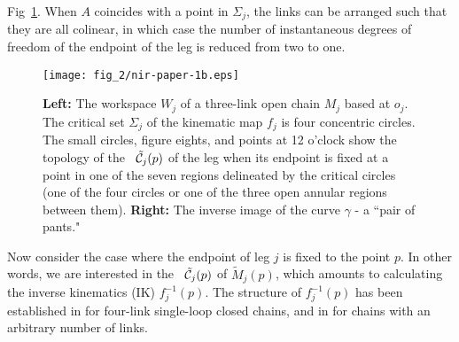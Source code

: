 Fig~\ref{fig:single-leg}. When $A$ coincides with a point in
$\Sigma_j$, the links can be arranged such that they are all
colinear, in which case the number of instantaneous degrees of
freedom of the endpoint of the leg is reduced from two to one.
%
\begin{figure}
  \centering
  \texttt{[image: fig\_2/nir-paper-1b.eps]}
  \caption{{\bf Left:} The workspace $W_j$ of a three-link open chain $M_j$
    based at $o_j$. The critical set $\Sigma_j$ of the kinematic map $f_j$ is four
    concentric circles.  The small circles, figure eights, and points at 12 o'clock
    show the topology of the \cspace \ $\tilde {\cal C}_j(p)$ of the
    leg when its endpoint is fixed at a point in one of the seven regions
    delineated by the critical circles (one of the four circles or one of
    the three open annular regions between them).  {\bf Right:} The inverse
    image of the curve $\gamma$ - a ``pair of pants."}
 \label{fig:single-leg}
\end{figure}
%
Now consider the case where the endpoint of leg $j$ is fixed to
the point $p$.  In other words, we are interested in the \cspace \
$\tilde {\cal C}_j(p)$ of $\tilde M_j(p)$, which amounts to
calculating the inverse kinematics (IK) $f_j^{-1}(p)$. The
structure of $f_j^{-1}(p)$ has been established in
\cite{Burdick89} for four-link single-loop closed chains, and in
\cite{MT2,MT1} for chains with an arbitrary number of links.

